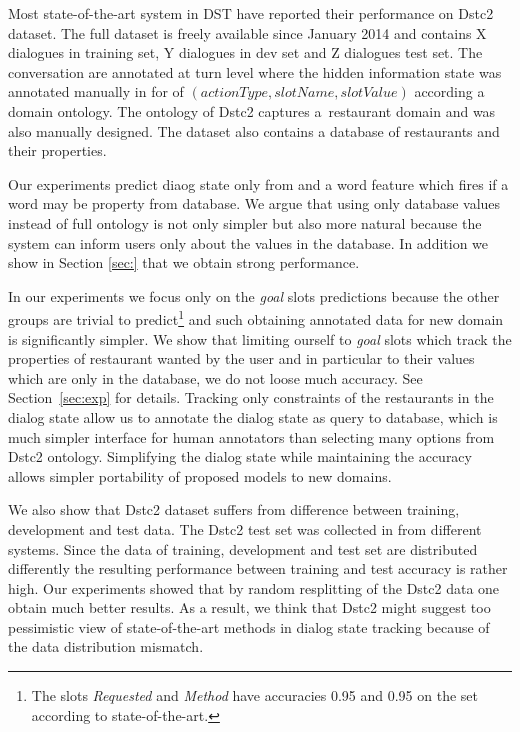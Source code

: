 \documentclass{itatnew}
\begin{document}
Most state-of-the-art system in DST have reported their performance on Dstc2 dataset\cite{henderson2014second}. 
The full dataset is freely available since January 2014 and contains X dialogues in training set, Y dialogues in dev set and Z dialogues test set.
The conversation are annotated at turn level where the hidden information state was annotated manually in for of $(actionType, slotName, slotValue)$
according a domain ontology.
The ontology of Dstc2 captures a~restaurant domain and was also manually designed.
The dataset also contains a database of restaurants and their properties.

Our experiments predict diaog state only from  and a word feature which fires if a word may be property from database.
We argue that using only database values instead of full ontology is not only simpler but also more natural because the system can inform users only about the values in the database.
In addition we show in Section \ref{sec:} that we obtain strong performance.

In our experiments we focus only on the {\it goal} slots predictions because the other groups are trivial to predict\footnote{The slots {\it Requested} and {\it Method} have accuracies 0.95 and 0.95 on the set according to state-of-the-art\cite{williams2014web}.} and such obtaining annotated data for new domain is significantly simpler.
We show that limiting ourself to {\it goal} slots which track the properties of restaurant wanted by the user  and in particular to their values which are only in the database, we do not loose much accuracy.
See Section~\ref{sec:exp} for details.
Tracking only constraints of the restaurants in the dialog state allow us to annotate the dialog state as query to database, which is much simpler interface for human annotators than selecting many options from Dstc2 ontology.
Simplifying the dialog state while maintaining the accuracy allows simpler portability of proposed models to new domains.

We also show that Dstc2 dataset suffers from difference between training, development and test data.
The Dstc2 test set was collected in from different systems\cite{henderson2014second}.
Since the data of training, development and test set are distributed differently the resulting performance between training and test accuracy is rather high. 
Our experiments showed that by random resplitting of the Dstc2 data one obtain much better results.
As a result, we think that Dstc2 might suggest too pessimistic view of state-of-the-art methods in dialog state tracking because of the data distribution mismatch.
\end{document}
